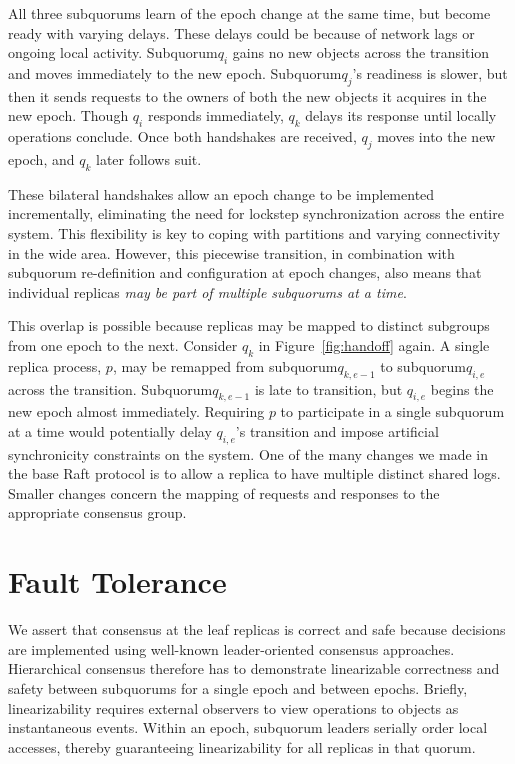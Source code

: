 \documentclass[10pt,conference]{IEEEtran}
\newcommand{\sub}{subquorum\xspace}
\newcommand{\Sub}{Subquorum\xspace}
\newcommand{\subs}{subquorums\xspace}
\begin{document}
All three \subs learn of the epoch change at the same time, but become ready
with varying delays.
These delays could be because of network lags or ongoing local activity.
\Sub $q_i$ gains no new objects across the transition and moves immediately to the new
epoch.
\Sub $q_j$'s readiness is slower, but then it sends requests to the
owners of both the new objects it acquires in the new epoch.
Though $q_i$ responds immediately, $q_k$ delays its response until locally
operations conclude.
Once both handshakes are received, $q_j$ moves into the new epoch, and $q_k$
later follows suit.

These bilateral handshakes allow an epoch change to be implemented
incrementally, eliminating the need for lockstep synchronization across the entire
system.
This flexibility is key to coping with partitions and varying connectivity in
the wide area.
However, this piecewise transition, in combination with \sub re-definition and
configuration at epoch changes, also means that individual replicas \emph{may
be part of multiple \subs at a time}.

This overlap is possible because replicas may be mapped to distinct subgroups
from one epoch to the next.
Consider $q_k$ in Figure~\ref{fig:handoff} again.
A single replica process, $p$, may be remapped from \sub $q_{k,e-1}$ to \sub $q_{i,e}$
across the transition.
\Sub $q_{k,e-1}$ is late to transition, but $q_{i,e}$ begins the new epoch
almost immediately.
Requiring $p$ to participate in a single \sub at a time would potentially delay
$q_{i,e}$'s transition and impose artificial synchronicity constraints on the
system.
One of the many changes we made in the base Raft protocol is to allow a replica to have
multiple distinct shared logs.
Smaller changes concern the mapping of requests and responses to the appropriate
consensus group.

\section{Fault Tolerance}
\label{section:ft}

We assert that consensus at the leaf replicas is correct and safe because decisions are
implemented using well-known leader-oriented consensus approaches.
Hierarchical consensus therefore has to demonstrate linearizable correctness and safety
between \subs for a single epoch and between epochs.
Briefly, linearizability requires external observers to view operations to objects as
instantaneous events.
Within an epoch, subquorum leaders serially order local accesses, thereby guaranteeing
linearizability for all replicas in that quorum.
\end{document}
